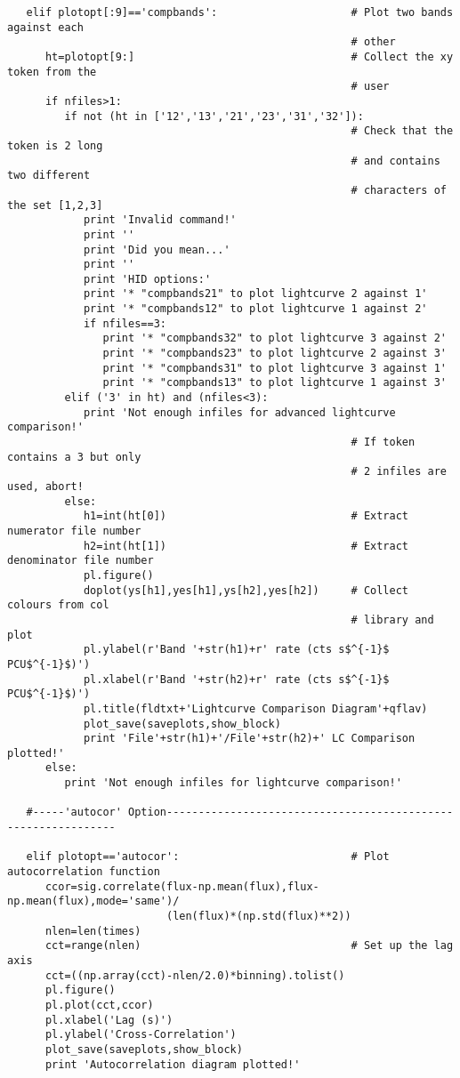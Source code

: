 \begin{verbatim}
   elif plotopt[:9]=='compbands':                     # Plot two bands against each
                                                      # other
      ht=plotopt[9:]                                  # Collect the xy token from the
                                                      # user
      if nfiles>1:
         if not (ht in ['12','13','21','23','31','32']):
                                                      # Check that the token is 2 long
                                                      # and contains two different
                                                      # characters of the set [1,2,3]
            print 'Invalid command!'
            print ''
            print 'Did you mean...'
            print ''
            print 'HID options:'
            print '* "compbands21" to plot lightcurve 2 against 1'
            print '* "compbands12" to plot lightcurve 1 against 2'
            if nfiles==3:
               print '* "compbands32" to plot lightcurve 3 against 2'
               print '* "compbands23" to plot lightcurve 2 against 3'
               print '* "compbands31" to plot lightcurve 3 against 1'
               print '* "compbands13" to plot lightcurve 1 against 3'
         elif ('3' in ht) and (nfiles<3):
            print 'Not enough infiles for advanced lightcurve comparison!'
                                                      # If token contains a 3 but only
                                                      # 2 infiles are used, abort!
         else:
            h1=int(ht[0])                             # Extract numerator file number
            h2=int(ht[1])                             # Extract denominator file number
            pl.figure()
            doplot(ys[h1],yes[h1],ys[h2],yes[h2])     # Collect colours from col
                                                      # library and plot
            pl.ylabel(r'Band '+str(h1)+r' rate (cts s$^{-1}$ PCU$^{-1}$)')
            pl.xlabel(r'Band '+str(h2)+r' rate (cts s$^{-1}$ PCU$^{-1}$)')
            pl.title(fldtxt+'Lightcurve Comparison Diagram'+qflav)
            plot_save(saveplots,show_block)
            print 'File'+str(h1)+'/File'+str(h2)+' LC Comparison plotted!'
      else:
         print 'Not enough infiles for lightcurve comparison!'

   #-----'autocor' Option--------------------------------------------------------------

   elif plotopt=='autocor':                           # Plot autocorrelation function
      ccor=sig.correlate(flux-np.mean(flux),flux-np.mean(flux),mode='same')/
                         (len(flux)*(np.std(flux)**2))
      nlen=len(times)
      cct=range(nlen)                                 # Set up the lag axis
      cct=((np.array(cct)-nlen/2.0)*binning).tolist()
      pl.figure()
      pl.plot(cct,ccor)
      pl.xlabel('Lag (s)')
      pl.ylabel('Cross-Correlation')
      plot_save(saveplots,show_block)
      print 'Autocorrelation diagram plotted!'


\end{verbatim}
